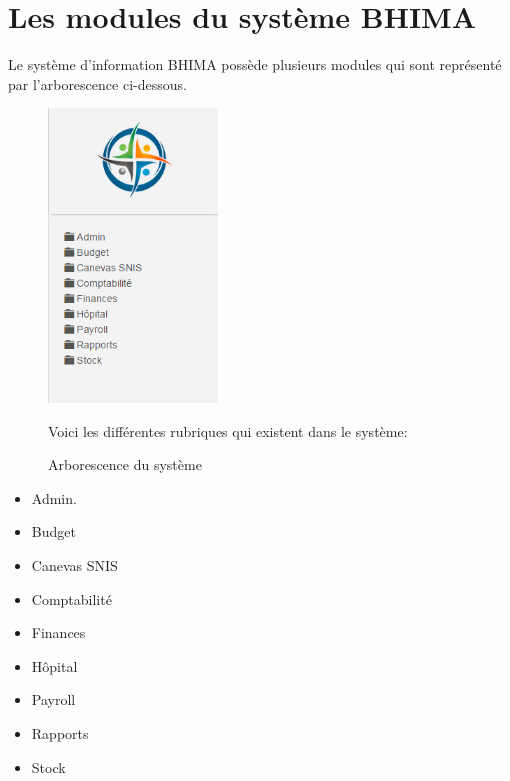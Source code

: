 \documentclass[12pt,a4paper]{report}
\begin{document}
\section{Les modules du système BHIMA}
Le système d'information BHIMA possède plusieurs modules qui sont représenté par l'arborescence ci-dessous.
\begin{figure}[h]
\begin{center}
\includegraphics[width=4.5cm]{pic/arbo.png}
\end{center}
\caption{Arborescence du système}
\label{Arborescence du système}
Voici les différentes rubriques qui existent dans le système:
\end{figure} 
\begin{itemize}
\item Admin. %
\item Budget
\item Canevas SNIS
\item Comptabilité
\item Finances
\item Hôpital
\item Payroll
\item Rapports
\item Stock
\end{itemize}


\newpage
    
\end{document}
